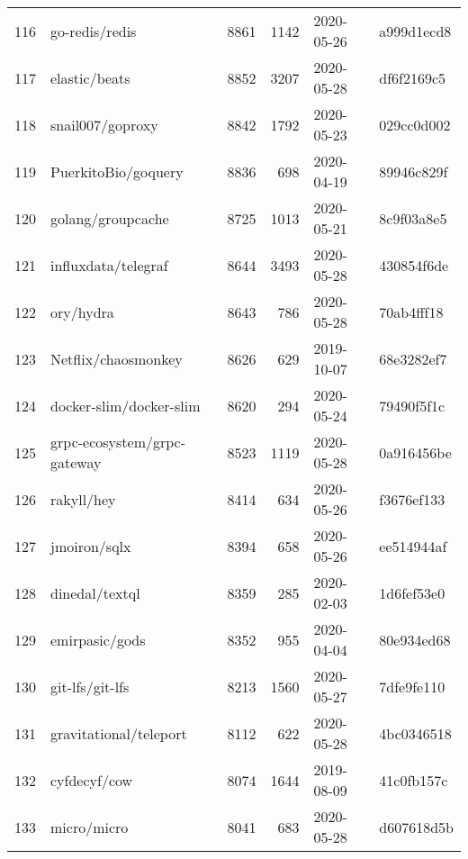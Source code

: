 \begin{longtable}{llrrll}
    116 &                                     go-redis/redis &   8861 &   1142 & 2020-05-26 &  a999d1ecd8 \\
    117 &                                      elastic/beats &   8852 &   3207 & 2020-05-28 &  df6f2169c5 \\
    118 &                                   snail007/goproxy &   8842 &   1792 & 2020-05-23 &  029cc0d002 \\
    119 &                                PuerkitoBio/goquery &   8836 &    698 & 2020-04-19 &  89946c829f \\
    120 &                                  golang/groupcache &   8725 &   1013 & 2020-05-21 &  8c9f03a8e5 \\
    121 &                                influxdata/telegraf &   8644 &   3493 & 2020-05-28 &  430854f6de \\
    122 &                                          ory/hydra &   8643 &    786 & 2020-05-28 &  70ab4fff18 \\
    123 &                                Netflix/chaosmonkey &   8626 &    629 & 2019-10-07 &  68e3282ef7 \\
    124 &                            docker-slim/docker-slim &   8620 &    294 & 2020-05-24 &  79490f5f1c \\
    125 &                        grpc-ecosystem/grpc-gateway &   8523 &   1119 & 2020-05-28 &  0a916456be \\
    126 &                                         rakyll/hey &   8414 &    634 & 2020-05-26 &  f3676ef133 \\
    127 &                                       jmoiron/sqlx &   8394 &    658 & 2020-05-26 &  ee514944af \\
    128 &                                     dinedal/textql &   8359 &    285 & 2020-02-03 &  1d6fef53e0 \\
    129 &                                     emirpasic/gods &   8352 &    955 & 2020-04-04 &  80e934ed68 \\
    130 &                                    git-lfs/git-lfs &   8213 &   1560 & 2020-05-27 &  7dfe9fe110 \\
    131 &                             gravitational/teleport &   8112 &    622 & 2020-05-28 &  4bc0346518 \\
    132 &                                       cyfdecyf/cow &   8074 &   1644 & 2019-08-09 &  41c0fb157c \\
    133 &                                        micro/micro &   8041 &    683 & 2020-05-28 &  d607618d5b \\

\end{longtable}
